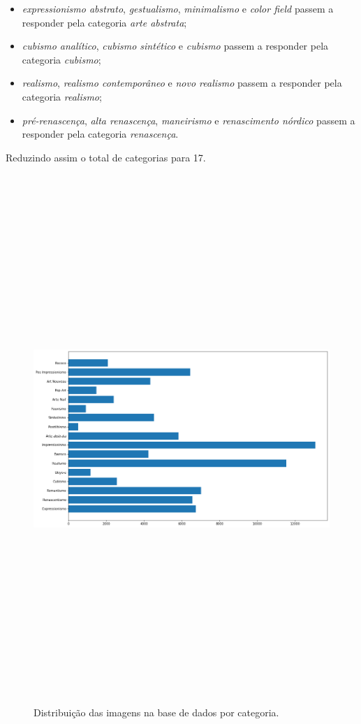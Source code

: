 \documentclass[12pt, a4paper]{article}
\begin{document}
\begin{itemize}
\item \emph{expressionismo abstrato}, \emph{gestualismo}, \emph{minimalismo} e \emph{color field} passem a responder pela categoria \emph{arte abstrata};
\item \emph{cubismo analítico}, \emph{cubismo sintético} e \emph{cubismo} passem a responder pela categoria \emph{cubismo};
\item \emph{realismo}, \emph{realismo contemporâneo} e \emph{novo realismo} passem a responder pela categoria \emph{realismo};
\item \emph{pré-renascença}, \emph{alta renascença}, \emph{maneirismo} e \emph{renascimento nórdico} passem a responder pela categoria \emph{renascença}.
\end{itemize}

Reduzindo assim o total de categorias para 17.
 
\begin{figure}[H]
	\centering
	\includegraphics[width=\textwidth, height=20cm, keepaspectratio=true]{fig/databalance}
	\caption{Distribuição das imagens na base de dados por categoria.}
\end{figure}
\end{document}

